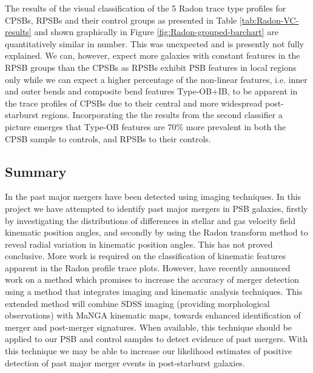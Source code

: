 The results of the visual classification of the 5 Radon trace type profiles for CPSBs, RPSBs and their control groups as presented in Table \ref{tab:Radon-VC-results} and shown graphically in Figure \ref{fig:Radon-grouped-barchart} are quantitatively similar in number. This was unexpected and is presently not fully explained. We can, however, expect more galaxies with constant features in the RPSB groups than the CPSBs as RPSBs exhibit PSB features in local regions only while we can expect a higher percentage of the non-linear features, i.e. inner and outer bends and composite bend features Type-OB+IB, to be apparent in the trace profiles of CPSBs due to their central and more widespread post-starburst regions. Incorporating the the results from the second classifier a picture emerges that Type-OB features are 70\% more prevalent in both the CPSB sample to controls, and RPSBs to their controls. 

\subsection{Summary}
\label{summary}
In the past major mergers have been detected using imaging techniques. In this project we have attempted to identify past major mergers in PSB galaxies, firstly by investigating the distributions of differences in stellar and gas velocity field kinematic position angles, and secondly by using the Radon transform method to reveal radial variation in kinematic position angles. This has not proved conclusive. More work is required on the classification of kinematic features apparent in the Radon profile trace plots. However, \cite{2019DDA....5020304N} have recently announced work on a method which promises to increase the accuracy of merger detection using a method that integrates imaging and kinematic analysis techniques. This extended method will combine SDSS imaging (providing morphological observations) with MaNGA  kinematic maps, towards enhanced identification of merger and post-merger signatures. When available, this technique should be applied to our PSB and control samples to detect evidence of past mergers. With this technique we may be able to increase our likelihood estimates of positive detection of past major merger events in post-starburst galaxies.

